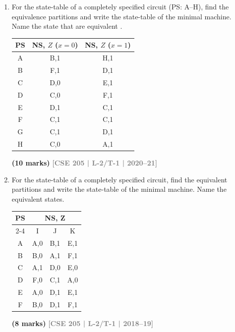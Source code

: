 \documentclass[12pt]{article}
\newcommand{\yr}[1]{\hfill\textcolor{gray}{\small\textbf{[#1]}}}
\newcommand{\mk}[1]{\textcolor{orange!70!black}{\small\textbf{(#1 marks)}}}
\begin{document}
\begin{enumerate}
\mk{11} \yr{CSE 205 | L-2/T-1 | 2022--23}



\item For the state-table of a completely specified circuit (PS: A--H), find the equivalence partitions and write the state-table of the minimal machine. Name the state that are equivalent .
\par\smallskip
\begin{center}
  
\begin{tabular}{c|cc}
\toprule
PS & NS, $Z$ ($x=0$) & NS, $Z$ ($x=1$)\\
\midrule
A & B,1 & H,1 \\ B & F,1 & D,1 \\ C & D,0 & E,1 \\ D & C,0 & F,1 \\
E & D,1 & C,1 \\ F & C,1 & C,1 \\ G & C,1 & D,1 \\ H & C,0 & A,1 \\
\bottomrule
\end{tabular}
\end{center}
\mk{10} \yr{CSE 205 | L-2/T-1 | 2020--21}



\item For the state-table of a completely specified circuit, find the equivalent partitions and write the state-table of the minimal machine. Name the equivalent states.

\begin{center}
  \begin{tabular}{|c|c|c|c|}
\hline
\multirow{2}{*}{PS} & \multicolumn{3}{c|}{NS, Z} \\ \cline{2-4} 
 & I & J & K \\ \hline
A & A,0 & B,1 & E,1 \\ \hline
B & B,0 & A,1 & F,1 \\ \hline
C & A,1 & D,0 & E,0 \\ \hline
D & F,0 & C,1 & A,0 \\ \hline
E & A,0 & D,1 & E,1 \\ \hline
F & B,0 & D,1 & F,1 \\ \hline
\end{tabular}
\end{center}

\mk{8} \yr{CSE 205 | L-2/T-1 | 2018--19}




\end{enumerate}
\end{document}
